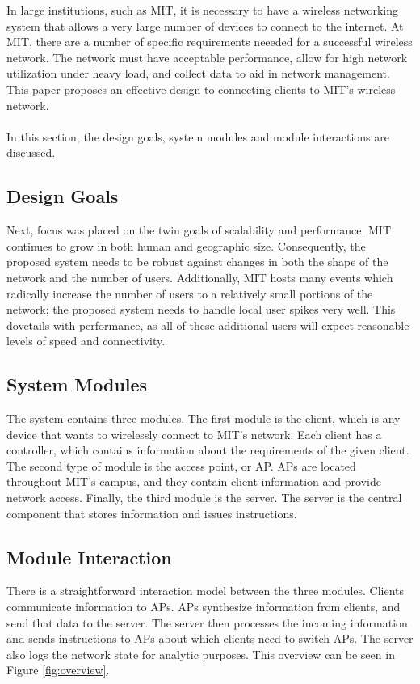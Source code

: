 \documentclass[10pt,journal,compsoc]{IEEEtran}
\begin{document}
		In large institutions, such as MIT, it is necessary to have a wireless networking system that allows a very large number of devices to connect to the internet. At MIT, there are a number of specific requirements neeeded for a successful wireless network. The network must have acceptable performance, allow for high network utilization under heavy load, and collect data to aid in network management. This paper proposes an effective design to connecting clients to MIT's wireless network.\\
        \\
        In this section, the design goals, system modules and module interactions are discussed.
        
        \subsection{Design Goals}
        
         
		Next, focus was placed on the twin goals of scalability and performance. MIT continues to grow in both human and geographic size. Consequently, the proposed system needs to be robust against changes in both the shape of the network and the number of users. Additionally, MIT hosts many events which radically increase the number of users to a relatively small portions of the network; the proposed system needs to handle local user spikes very well. This dovetails with performance, as all of these additional users will expect reasonable levels of speed and connectivity.
		
		\subsection{System Modules}
		The system contains three modules. The first module is the client, which is any device that wants to wirelessly connect to MIT's network. Each client has a controller, which contains information about the requirements of the given client. The second type of module is the access point, or AP. APs are located throughout MIT's campus, and they contain client information and provide network access. Finally, the third module is the server. The server is the central component that stores information and issues instructions.
		
		\subsection{Module Interaction}
		There is a straightforward interaction model between the three modules. Clients communicate information to APs. APs synthesize information from clients, and send that data to the server. The server then processes the incoming information and sends instructions to APs about which clients need to switch APs. The server also logs the network state for analytic purposes. This overview can be seen in Figure \ref{fig:overview}. 
		
\end{document}
